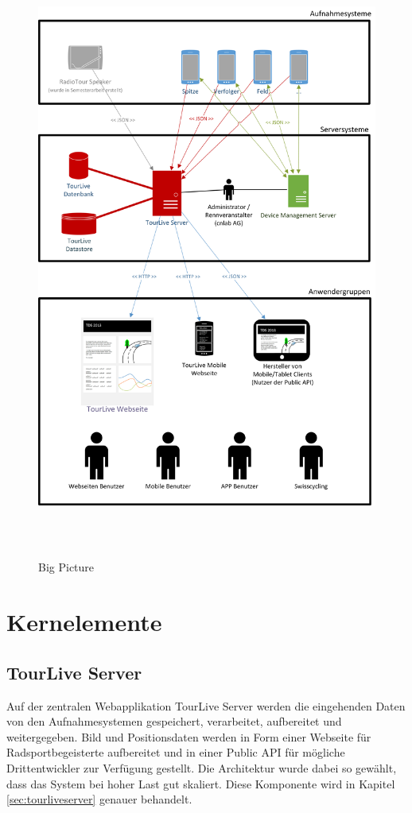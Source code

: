 \begin{figure}[H]
	\centering
	\includegraphics[height=200mm]{images/BigPicture.png}
	\caption{Big Picture}
	\label{fig:bigpicture}
\end{figure}

\pagebreak

\section{Kernelemente}
\subsection{TourLive Server}
Auf der zentralen Webapplikation TourLive Server werden die eingehenden Daten von den Aufnahmesystemen gespeichert, verarbeitet, aufbereitet und weitergegeben. Bild und Positionsdaten werden in Form einer Webseite für Radsportbegeisterte aufbereitet und in einer Public API für mögliche Drittentwickler zur Verfügung gestellt. Die Architektur wurde dabei so gewählt, dass das System bei hoher Last gut skaliert. Diese Komponente wird in Kapitel \ref{sec:tourliveserver} genauer behandelt.

